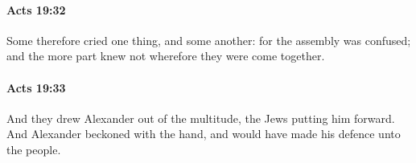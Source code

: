 		\paragraph{Acts 19:32} %
			\label{ACTS-19-32}

			Some therefore cried one thing, and some another: for the assembly was confused; and the more part knew not wherefore they were come together.

			\begin{framed}
			\scriptsize
				\begin{compactdesc}
					\item[SBLG] 
				\end{compactdesc}
			\end{framed}

		\paragraph{Acts 19:33} %
			\label{ACTS-19-33}

			And they drew Alexander out of the multitude, the Jews putting him forward.  And Alexander beckoned with the hand, and would have made his defence unto the people.

